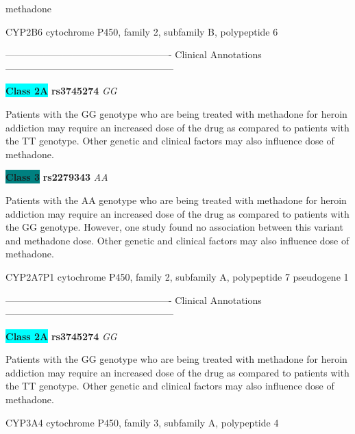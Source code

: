 \documentclass{resume} %
\begin{document}
\begin{rSection}{ methadone }
\begin{rSubsection}{ CYP2B6 }{ cytochrome P450, family 2, subfamily B, polypeptide 6 }{}{}
\item[] ---------------------------------------------------- Clinical Annotations -----------------------------------------------------\newline
\item \textbf{\colorbox{cyan} {Class 2A}} \textbf{ rs3745274 } \textit{ GG }
\item[] Patients with the GG genotype who are being treated with methadone for heroin addiction may require an increased dose of the drug as compared to patients with the TT genotype. Other genetic and clinical factors may also influence dose of methadone.\item \textbf{\colorbox{teal} {Class 3}} \textbf{ rs2279343 } \textit{ AA }
\item[] Patients with the AA genotype who are being treated with methadone for heroin addiction may require an increased dose of the drug as compared to patients with the GG genotype. However, one study found no association between this variant and methadone dose. Other genetic and clinical factors may also influence dose of methadone.
\end{rSubsection}\begin{rSubsection}{ CYP2A7P1 }{ cytochrome P450, family 2, subfamily A, polypeptide 7 pseudogene 1 }{}{}
\item[]

\item[] ---------------------------------------------------- Clinical Annotations -----------------------------------------------------\newline
\item \textbf{\colorbox{cyan} {Class 2A}} \textbf{ rs3745274 } \textit{ GG }
\item[] Patients with the GG genotype who are being treated with methadone for heroin addiction may require an increased dose of the drug as compared to patients with the TT genotype. Other genetic and clinical factors may also influence dose of methadone.
\end{rSubsection}\begin{rSubsection}{ CYP3A4 }{ cytochrome P450, family 3, subfamily A, polypeptide 4 }{}{}
\item[]


\end{rSubsection}
\end{rSection}
\end{document}
